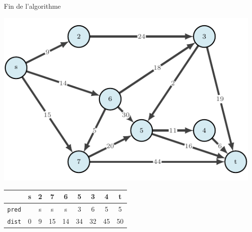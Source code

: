 \begin{frame}{Fin de l'algorithme}
    \begin{center}
        \includegraphics[height=.6\textheight]{fig/dijkstra-0.pdf}      
    \begin{tabular}{c|cccccccc}
      
        & \textbf{s}   &\textbf{2}     &\textbf{7}     &\textbf{6}     &\textbf{5}     &\textbf{3}     &\textbf{4}     &\textbf{t}     \\
        \hline
        \texttt{pred} & &s      &s      &s      &3      &6      &5      &5      \\
        \texttt{dist} & 0       &9      &15     &14     &34     &32     &45     &50     \\
                        \end{tabular}
\end{center}
\end{frame}





